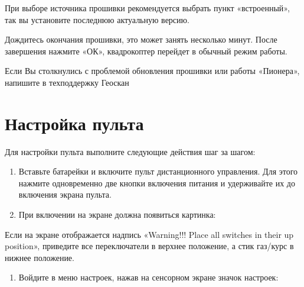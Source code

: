 \documentclass[a4paper,10pt,russian]{sphinxmanual}
\begin{document}
При выборе источника прошивки рекомендуется выбрать пункт «встроенный», так вы установите последнюю актуальную версию.

Дождитесь окончания прошивки, это может занять несколько минут. После завершения нажмите «ОК», квадрокоптер перейдет в обычный режим работы.

Если Вы столкнулись с проблемой обновления прошивки или работы «Пионера», напишите в техподдержку Геоскан


\section{Настройка пульта}
\label{\detokenize{settings/rc_setting:id1}}\label{\detokenize{settings/rc_setting::doc}}
Для настройки пульта выполните следующие действия шаг за шагом:
\begin{enumerate}
\def\theenumi{\arabic{enumi}}
\def\labelenumi{\theenumi .}
\makeatletter\def\p@enumii{\p@enumi \theenumi .}\makeatother
\item {} 
Вставьте батарейки и включите пульт дистанционного управления. Для этого нажмите одновременно две кнопки включения питания и удерживайте их до включения экрана пульта.

\item {} 
При включении на экране должна появиться картинка:

\end{enumerate}


Если на экране отображается надпись «Warning!!! Place all switches in their up position», приведите все переключатели в верхнее положение, а стик газ/курс в нижнее положение.
\begin{enumerate}
\def\theenumi{\arabic{enumi}}
\def\labelenumi{\theenumi .}
\makeatletter\def\p@enumii{\p@enumi \theenumi .}\makeatother
\setcounter{enumi}{2}
\item {} 
Войдите в меню настроек, нажав на сенсорном экране значок настроек:

\end{enumerate}
\end{document}
